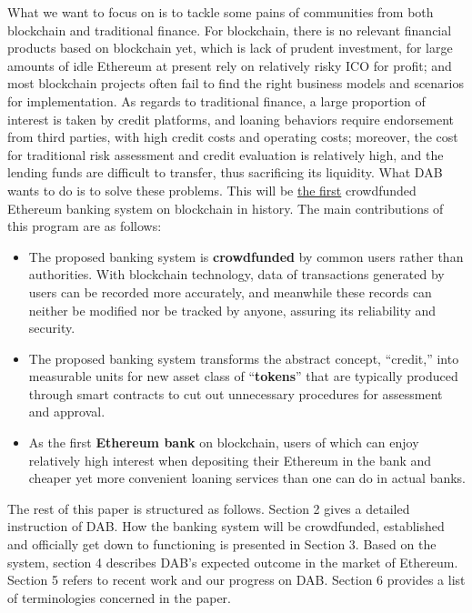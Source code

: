 \documentclass[review]{elsarticle}
\begin{document}
What we want to focus on is to tackle some pains of communities from both blockchain and traditional finance. For blockchain, there is no relevant financial products based on blockchain yet, which is lack of prudent investment, for large amounts of idle Ethereum at present rely on relatively risky ICO for profit; and most blockchain projects often fail to find the right business models and scenarios for implementation. As regards to traditional finance, a large proportion of interest is taken by credit platforms, and loaning behaviors require endorsement from third parties, with high credit costs and operating costs; moreover, the cost for traditional risk assessment and credit evaluation is relatively high, and the lending funds are difficult to transfer, thus sacrificing its liquidity. What DAB wants to do is to solve these problems.
This will be \underline{the first} crowdfunded Ethereum banking system on blockchain in history. The main contributions of this program are as follows:

\begin{itemize}
   \item The proposed banking system is \textbf{crowdfunded} by common users rather than authorities. With blockchain technology, data of transactions generated by users can be recorded more accurately, and meanwhile these records can neither be modified nor be tracked by anyone, assuring its reliability and security.
   \item The proposed banking system transforms the abstract concept, ``credit,'' into measurable units for new asset class of ``\textbf{tokens}'' that are typically produced through smart contracts to cut out unnecessary procedures for assessment and approval.
   \item As the first \textbf{Ethereum bank} on blockchain, users of which can enjoy relatively high interest when depositing their Ethereum in the bank and cheaper yet more convenient loaning services than one can do in actual banks.
\end{itemize}

The rest of this paper is structured as follows. Section 2 gives a detailed instruction of DAB. How the banking system will be crowdfunded, established and officially get down to functioning is presented in Section 3. Based on the system, section 4 describes DAB's expected outcome in the market of Ethereum. Section 5 refers to recent work and our progress on DAB. Section 6 provides a list of terminologies concerned in the paper.
\end{document}
